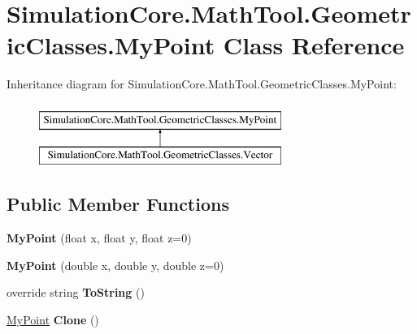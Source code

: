 \hypertarget{class_simulation_core_1_1_math_tool_1_1_geometric_classes_1_1_my_point}{}\section{Simulation\+Core.\+Math\+Tool.\+Geometric\+Classes.\+My\+Point Class Reference}
\label{class_simulation_core_1_1_math_tool_1_1_geometric_classes_1_1_my_point}
Inheritance diagram for Simulation\+Core.\+Math\+Tool.\+Geometric\+Classes.\+My\+Point\+:\begin{figure}[H]
\begin{center}
\leavevmode
\includegraphics[height=2.000000cm]{class_simulation_core_1_1_math_tool_1_1_geometric_classes_1_1_my_point}
\end{center}
\end{figure}
\subsection*{Public Member Functions}
\begin{DoxyCompactItemize}
\item 
{\bfseries My\+Point} (float x, float y, float z=0)\hypertarget{class_simulation_core_1_1_math_tool_1_1_geometric_classes_1_1_my_point_a6b7a395516019ef81158f157b8e1643a}{}\label{class_simulation_core_1_1_math_tool_1_1_geometric_classes_1_1_my_point_a6b7a395516019ef81158f157b8e1643a}

\item 
{\bfseries My\+Point} (double x, double y, double z=0)\hypertarget{class_simulation_core_1_1_math_tool_1_1_geometric_classes_1_1_my_point_ae99b8c81e6592736698a45f42db2d13f}{}\label{class_simulation_core_1_1_math_tool_1_1_geometric_classes_1_1_my_point_ae99b8c81e6592736698a45f42db2d13f}

\item 
override string {\bfseries To\+String} ()\hypertarget{class_simulation_core_1_1_math_tool_1_1_geometric_classes_1_1_my_point_afba73014794ed8fbf9d967d8f02e6317}{}\label{class_simulation_core_1_1_math_tool_1_1_geometric_classes_1_1_my_point_afba73014794ed8fbf9d967d8f02e6317}

\item 
\hyperlink{class_simulation_core_1_1_math_tool_1_1_geometric_classes_1_1_my_point}{My\+Point} {\bfseries Clone} ()\hypertarget{class_simulation_core_1_1_math_tool_1_1_geometric_classes_1_1_my_point_a6141e1c659c1c67949079ce11c6fb6d7}{}\label{class_simulation_core_1_1_math_tool_1_1_geometric_classes_1_1_my_point_a6141e1c659c1c67949079ce11c6fb6d7}

\end{DoxyCompactItemize}
